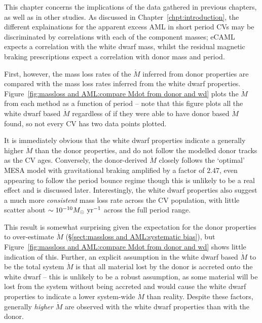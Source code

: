 \label{chpt:discussion} %

This chapter concerns the implications of the data gathered in previous chapters, as well as in other studies. As discussed in Chapter~\ref{chpt:introduction}, the different explainations for the apparent excess AML in short period CVs may be discriminated by correlations with each of the component masses; eCAML expects a correlation with the white dwarf mass, whilst the residual magnetic braking prescriptions expect a correlation with donor mass and period.

First, however, the mass loss rates of the $\dot M$ inferred from donor properties are compared with the mass loss rates inferred from the white dwarf properties.
Figure~\ref{fig:massloss and AML:compare Mdot from donor and wd} plots the $\dot M$ from each method as a function of period -- note that this figure plots all the white dwarf based $\dot M$ regardless of if they were able to have donor based $\dot M$ found, so not every CV has two data points plotted.

It is immediately obvious that the white dwarf properties indicate a generally higher $\dot M$ than the donor properties, and do not follow the modelled donor tracks as the CV ages.
Conversely, the donor-derived $\dot M$ closely follows the `optimal' MESA model with gravitational braking amplified by a factor of $2.47$, even appearing to follow the period bounce regime though this is unlikely to be a real effect and is discussed later.
Interestingly, the white dwarf properties also suggest a much more \textit{consistent} mass loss rate across the CV population, with little scatter about $\sim 10^{-10} M_\odot~{\rm yr}^{-1}$ across the full period range.

This result is somewhat surprising given the expectation for the donor properties to over-estimate $\dot M$ (\S\ref{sect:massloss and AML:systematic bias}), but Figure~\ref{fig:massloss and AML:compare Mdot from donor and wd} shows little indication of this.
Further, an explicit assumption in the white dwarf based $\dot M$ to be the total system $\dot M$ is that all material lost by the donor is accreted onto the white dwarf -- this is unlikely to be a robust assumption, as some material will be lost from the system without being accreted and would cause the white dwarf properties to indicate a lower system-wide $\dot M$ than reality.
Despite these factors, generally \textit{higher} $\dot M$ are observed with the white dwarf properties than with the donor.

